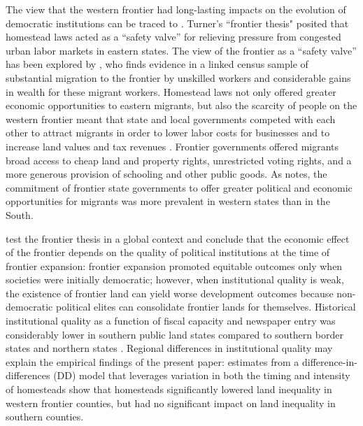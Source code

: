 \documentclass[12pt]{article}
\begin{document}
The view that the western frontier had long-lasting impacts on the evolution of democratic institutions can be traced to \citet{turner1956significance}. Turner's ``frontier thesis" posited that homestead laws acted as a ``safety valve'' for relieving pressure from congested urban labor markets in eastern states. The view of the frontier as a ``safety valve'' has been explored by \citet{ferrie1997migration}, who finds evidence in a linked census sample of substantial migration to the frontier by unskilled workers and considerable gains in wealth for these migrant workers. Homestead laws not only offered greater economic opportunities to eastern migrants, but also the scarcity of people on the western frontier meant that state and local governments competed with each other to attract migrants in order to lower labor costs for businesses and to increase land values and tax revenues \citep{engerman2005evolution}. Frontier governments offered migrants broad access to cheap land and property rights, unrestricted voting rights, and a more generous provision of schooling and other public goods. As \citet{engerman2005evolution} notes, the commitment of frontier state governments to offer greater political and economic opportunities for migrants was more prevalent in western states than in the South. 

\citet{garcia2009myth} test the frontier thesis in a global context and conclude that the economic effect of the frontier depends on the quality of political institutions at the time of frontier expansion: frontier expansion promoted equitable outcomes only when societies were initially democratic; however, when institutional quality is weak, the existence of frontier land can yield worse development outcomes because non-democratic political elites can consolidate frontier lands for themselves. Historical institutional quality as a function of fiscal capacity and newspaper entry was considerably lower in southern public land states compared to southern border states and northern states \citep{grosjean2014}. Regional differences in institutional quality may explain the empirical findings of the present paper: estimates from a difference-in-differences (DD) model that leverages variation in both the timing and intensity of homesteads show that homesteads significantly lowered land inequality in western frontier counties, but had no significant impact on land inequality in southern counties. 

\end{document}
